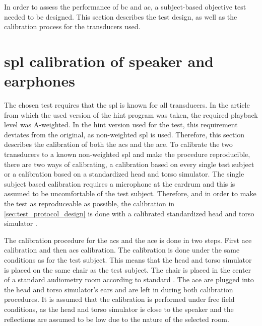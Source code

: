 \label{sec:test_description}
In order to assess the performance of \gls{bc} and \gls{ac}, a subject-based objective test needed to be designed. This section describes the test design, as well as the calibration process for the transducers used.






\section{\gls{spl} calibration of speaker and earphones}\label{sec:cal}
The chosen test requires that the \gls{spl} is known for all transducers. In the article from which the used version of the \gls{hint} program was taken, the required playback level was A-weighted. In the \gls{hint} version used for the test, this requirement deviates from the original, as non-weighted \gls{spl} is used. Therefore, this section describes the calibration of both the \gls{acs} and the \gls{ace}. To calibrate the two transducers to a known non-weighted \gls{spl} and make the procedure reproducible, there are two ways of calibrating, a calibration based on every single test subject or a calibration based on a standardized head and torso simulator. The single subject based calibration requires a microphone at the eardrum \citep{iso_11904-1} and this is assumed to be uncomfortable of the test subject. Therefore, and in order to make the test as reproduceable as possible, the calibration in \autoref{sec:test_protocol_design} is done with a calibrated standardized head and torso simulator \citep{iso_11904-2}.

The calibration procedure for the \gls{acs} and the \gls{ace} is done in two steps. First \gls{ace} calibration and then \gls{acs} calibration. The calibration is done under the same conditions as for the test subject. This means that the head and torso simulator is placed on the same chair as the test subject. The chair is placed in the center of a standard audiometry room according to standard \citep{iso_8253-2}. The \gls{ace} are plugged into the head and torso simulator's ears and are left in during both calibration procedures. It is assumed that the calibration is performed under free field conditions, as the head and torso simulator is close to the speaker and the reflections are assumed to be low due to the nature of the selected room. 

